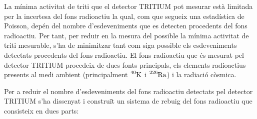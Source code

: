 La mínima activitat de triti que el detector TRITIUM pot mesurar està limitada per la incertesa del fons radioactiu la qual, com que segueix una estadística de Poisson, depén del nombre d'esdeveniments que es detecten procedents del fons radioactiu. Per tant, per reduir en la mesura del possible la mínima activitat de triti mesurable, s'ha de minimitzar tant com siga possible els esdeveniments detectats procedents del fons radioactiu. El fons radioactiu que és mesurat pel detector TRITIUM procedeix de dues fonts principals, els elements radioactius presents al medi ambient (principalment $\ce{^{40}K}$ i $\ce{^{226}Ra}$) i la radiació còsmica.

Per a reduir el nombre d'esdeveniments del fons radioactiu detectats pel detector TRITIUM s'ha dissenyat i construït un sistema de rebuig del fons radioactiu que consisteix en dues parts:

